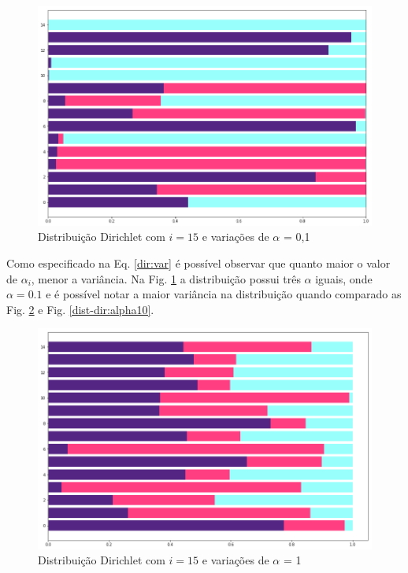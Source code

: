 \begin{figure}[!h]
	\centering
	\includegraphics[keepaspectratio=true,scale=0.4]{figuras/resultados-dist-dir-01-3.png}
	\caption{Distribuição Dirichlet com $i=15$ e variações de $\alpha$ = 0,1 }
	\label{dist-dir:alpha01}
\end{figure}

Como especificado na Eq. \ref{dir:var} é possível observar que quanto maior o valor de $\alpha_i$, menor a variância. %
Na Fig. \ref{dist-dir:alpha01} a distribuição possui três $\alpha$ iguais, onde $\alpha=0.1$ e é possível notar a maior variância na distribuição quando comparado as Fig. \ref{dist-dir:alpha1} e Fig. \ref{dist-dir:alpha10}.


\begin{figure}[!h]
	\centering
	\includegraphics[keepaspectratio=true,scale=0.4]{figuras/resultados-dist-dir-1-3.png}
	\caption{Distribuição Dirichlet com $i=15$ e variações de $\alpha$ = 1 }
	\label{dist-dir:alpha1}
\end{figure}

